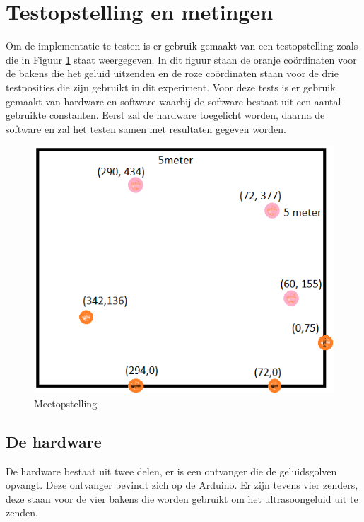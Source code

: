 \documentclass{article}
\begin{document}
\section{Testopstelling en metingen}
Om de implementatie te testen is er gebruik gemaakt van een testopstelling zoals die in Figuur \ref{Meetopstelling} staat weergegeven. In dit figuur staan de oranje co\"{o}rdinaten voor de bakens die het geluid uitzenden en de roze co\"{o}rdinaten staan voor de drie testposities die zijn gebruikt in dit experiment. Voor deze tests is er gebruik gemaakt van hardware en software waarbij de software bestaat uit een aantal gebruikte constanten. Eerst zal de hardware toegelicht worden, daarna de software en zal het testen samen met resultaten gegeven worden.  

\begin{figure}[h] 
\centering\includegraphics[scale=0.5]{Meetopstelling.png}
\caption{Meetopstelling}
\label{Meetopstelling}
\end{figure}

\subsection{De hardware}
De hardware bestaat uit twee delen, er is een ontvanger die de geluidsgolven opvangt. Deze ontvanger bevindt zich op de Arduino. Er zijn tevens vier zenders, deze staan voor de vier bakens die worden gebruikt om het ultrasoongeluid uit te zenden. 
\end{document}

